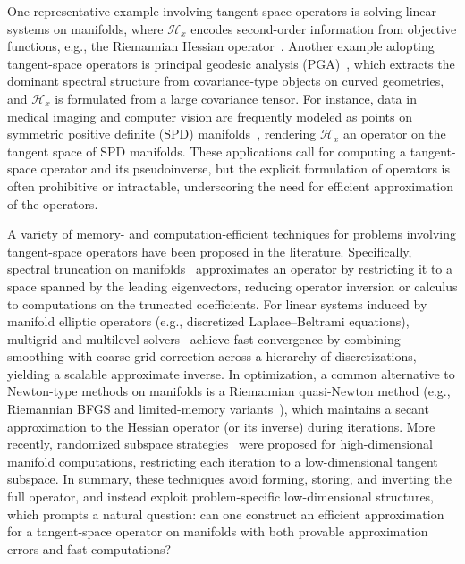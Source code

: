 \documentclass[final,onefignum,onetabnum]{siamart250211}
\begin{document}
One representative example involving tangent-space operators is solving linear systems on manifolds, where $\mathcal{H}_x$ encodes second-order information from objective functions, e.g., the Riemannian Hessian operator~\cite{absil2008optimization, boumal2023introduction}. 
Another example adopting tangent-space operators is principal geodesic analysis (PGA)~\cite{fletcher2004principal}, which extracts the dominant spectral structure from covariance-type objects on curved geometries, and $\mathcal{H}_x$ is formulated from a large covariance tensor. For instance, data in medical imaging and computer vision are frequently modeled as points on symmetric positive definite (SPD) manifolds~\cite{Pennec2006}, rendering $\mathcal{H}_x$ an operator on the tangent space of SPD manifolds. These applications call for computing a tangent-space operator and its pseudoinverse, but the explicit formulation of operators is often prohibitive or intractable, underscoring the need for efficient approximation of the operators.

A variety of memory- and computation-efficient techniques for problems involving tangent-space operators have been proposed in the literature. Specifically, spectral truncation on manifolds~\cite{ValletLevy2008_ManifoldHarmonics} approximates an operator by restricting it to a space spanned by the leading eigenvectors, reducing operator inversion or calculus to computations on the truncated coefficients.
For linear systems induced by manifold elliptic operators (e.g., discretized Laplace--Beltrami equations), multigrid and multilevel solvers~\cite{BonitoPasciak2012} achieve fast convergence by combining smoothing with coarse-grid correction across a hierarchy of discretizations, yielding a scalable approximate inverse. 
In optimization, a common alternative to Newton-type methods on manifolds is a Riemannian quasi-Newton method (e.g., Riemannian BFGS and limited-memory variants~\cite{HuangAbsilGallivan2016_RBFGS}), which maintains a secant approximation to the Hessian operator (or its inverse) during iterations. 
More recently, randomized subspace strategies~\cite{gutman2023coordinate,han2024riemannian} were proposed for high-dimensional manifold computations, restricting each iteration to a low-dimensional tangent subspace. In summary, these techniques avoid forming, storing, and inverting the full operator, and instead exploit problem-specific low-dimensional structures, which prompts a natural question: can one construct an efficient approximation for a tangent-space operator on manifolds with both provable approximation errors and fast computations?
\end{document}
